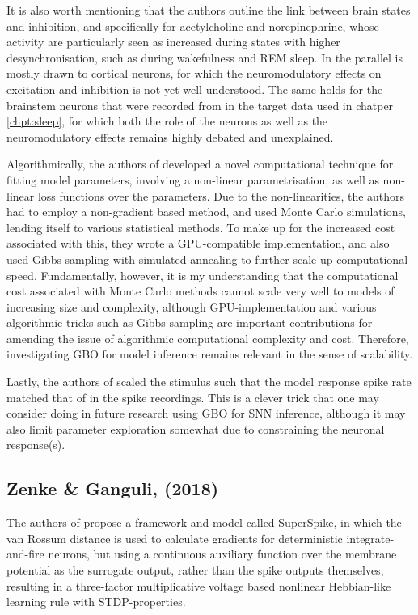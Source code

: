 \documentclass[mphil,deptreport,ianc]{infthesis} %
\begin{document}
It is also worth mentioning that the authors outline the link between brain states and inhibition, and specifically for acetylcholine and norepinephrine, whose activity are particularly seen as increased during states with higher desynchronisation, such as during wakefulness and REM sleep.
In \cite{Stringer2016InhibitoryNetworks} the parallel is mostly drawn to cortical neurons, for which the neuromodulatory effects on excitation and inhibition is not yet well understood. 
The same holds for the brainstem neurons that were recorded from in the target data used in chatper \ref{chpt:sleep}, for which both the role of the neurons as well as the neuromodulatory effects remains highly debated and unexplained.

Algorithmically, the authors of \cite{Stringer2016InhibitoryNetworks} developed a novel computational technique for fitting model parameters, involving a non-linear parametrisation, as well as non-linear loss functions over the parameters.
Due to the non-linearities, the authors had to employ a non-gradient based method, and used Monte Carlo simulations, lending itself to various statistical methods.
To make up for the increased cost associated with this, they wrote a GPU-compatible implementation, and also used Gibbs sampling with simulated annealing to further scale up computational speed.
Fundamentally, however, it is my understanding that the computational cost associated with Monte Carlo methods cannot scale very well to models of increasing size and complexity, although GPU-implementation and various algorithmic tricks such as Gibbs sampling are important contributions for amending the issue of algorithmic computational complexity and cost.
Therefore, investigating GBO for model inference remains relevant in the sense of scalability.

Lastly, the authors of \cite{Stringer2016InhibitoryNetworks} scaled the stimulus such that the model response spike rate matched that of in the spike recordings.
This is a clever trick that one may consider doing in future research using GBO for SNN inference, although it may also limit parameter exploration somewhat due to constraining the neuronal response(s).


\subsection{Zenke \& Ganguli, (2018)}

The authors of \cite{Zenke2018} propose a framework and model called SuperSpike, in which the van Rossum distance is used to calculate gradients for deterministic integrate-and-fire neurons, but using a continuous auxiliary function over the membrane potential as the surrogate output, rather than the spike outputs themselves, resulting in a three-factor multiplicative voltage based nonlinear Hebbian-like learning rule with STDP-properties.
\end{document}
